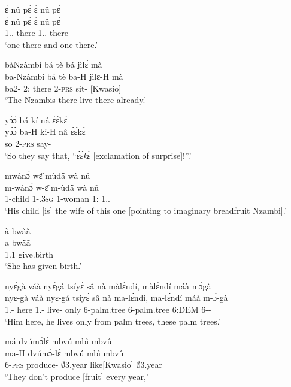 \begin{exe}[(N234)]
\exN\label{n20}
  \glll  ɛ́ nû pɛ̀  ɛ́ nû pɛ̀ \\
          ɛ́ nû pɛ̀  ɛ́ nû pɛ̀ \\
            {\LOC} 1.{\DEM}.{\PROX} there {\LOC} 1.{\DEM}.{\PROX} there   \\
    \trans `one there and one there.'
 
\exN\label{n21}
  \glll   bàNzàmbí bá tè bá jìlɛ́ mà \\
          ba-Nzàmbí bá tè ba-H jìlɛ-H mà \\
              ba2-{\PN} 2:{\ATT}  there 2-\textsc{prs} sit-{\R} {\COMPL}[Kwasio]   \\
    \trans `The Nzambis there live there already.'
 
\exN\label{n22}
  \glll  yɔ́ɔ̀ bá kí nâ ɛ́ɛ́kɛ̀ \\
            yɔ́ɔ̀ ba-H ki-H nâ ɛ́ɛ́kɛ̀ \\
         so 2-\textsc{prs} say-{\R} {\COMP} {\EXCL} \\
    \trans `So they say that, ``{\itshape ɛ́ɛ́kɛ̀} [exclamation of surprise]!''.'
 
\exN\label{n23}
  \glll  mwánɔ̀ wɛ̂ mùdã̂ wà nû \\
         m-wánɔ̀ w-ɛ̂ m-ùdã̂ wà nû \\
            {\N}1-child 1-{\POSS}.3\textsc{sg} {\N}1-woman 1:{\ATT}  1.{\DEM}.{\PROX} \\
    \trans `His child [is] the wife of this one [pointing to imaginary breadfruit Nzambi].'
 
\exN\label{n24}
  \glll  à bwã̀ã̀ \\
         a bwã̀ã̀ \\
          1.{\PST}1 give.birth \\
    \trans `She has given birth.'
 
\exN\label{n25}
  \glll nyɛ̀gà váà nyɛ̀gá tsíyɛ́ sâ nà màlɛ́ndí, màlɛ́ndí máà mɔ́gà \\
         nyɛ-gà váà nyɛ-gá tsíyɛ́ sâ nà ma-lɛ́ndí, ma-lɛ́ndí máà m-ɔ́-gà \\
          1.{\SBJ}-{\CONTR} here 1.{\SBJ}-{\CONTR} live-{\R} only {\COM} 6-palm.tree 6-palm.tree 6:DEM 6-{\OBJ}-{\CONTR} \\
    \trans `Him here, he lives only from palm trees, these palm trees.'
 
\exN\label{n26} 
  \glll  má dvúmɔ́lɛ́ mbvú mbì mbvû \\
        ma-H dvúmɔ́-lɛ́ mbvú mbì mbvû \\
           6-\textsc{prs} produce-{\NEG}  $\emptyset$3.year like[Kwasio] $\emptyset$3.year \\
    \trans `They don't produce [fruit] every year,'
 

\end{exe}
